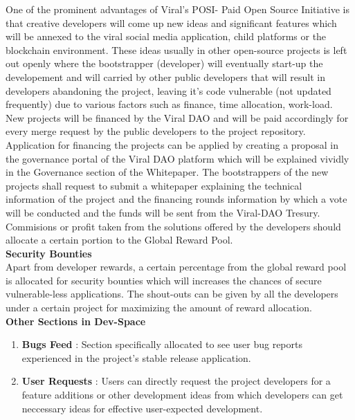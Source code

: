 \documentclass[10pt]{article}
\begin{document}
One of the prominent advantages of Viral's POSI- Paid Open Source Initiative is that creative developers will come up new ideas and significant features which will be annexed to the viral social media application, child platforms or the blockchain environment. These ideas usually in other open-source projects is left out openly where the bootstrapper (developer) will eventually start-up the developement and will carried by other public developers that will result in developers abandoning the project, leaving it's code vulnerable (not updated frequently) due to various factors such as finance, time allocation, work-load.  New projects will be financed by the Viral DAO and will be paid accordingly for every merge request by the public developers to the project repository. Application for financing the projects can be applied by creating a proposal in the governance portal of the Viral DAO platform which will be explained vividly in the Governance section of the Whitepaper. The bootstrappers of the new projects shall request to submit a whitepaper explaining the technical information of the project and the financing rounds information by which a vote will be conducted and the funds will be sent from the Viral-DAO Tresury. Commisions or profit taken from the solutions offered by the developers should allocate a certain portion to the Global Reward Pool. \\

\textbf{Security Bounties}\\

Apart from developer rewards, a certain percentage from the global reward pool is allocated for security bounties which will increases the chances of secure vulnerable-less applications. The shout-outs can be given by all the developers under a certain project for maximizing the amount of reward allocation.\\

\textbf{Other Sections in Dev-Space}
\begin{enumerate}[leftmargin=+0.2in]
\item \textbf{Bugs Feed} : Section specifically allocated to see user bug reports experienced in the project's stable release application.
\item \textbf{User Requests} : Users can directly request the project developers for a feature additions or other development ideas from which developers can get neccessary ideas for effective user-expected development.
\end{enumerate}
\end{document}
